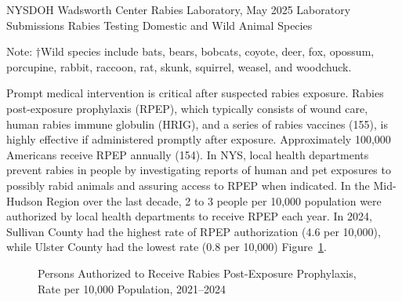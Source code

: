 \documentclass[
  english,
  letterpaper,
]{report}
\begin{document}
\begin{tcolorbox}[enhanced jigsaw, breakable, leftrule=.75mm, title=\textcolor{quarto-callout-note-color}{\faInfo}\hspace{0.5em}{Source}, bottomrule=.15mm, opacityback=0, left=2mm, colback=white, bottomtitle=1mm, coltitle=black, colbacktitle=quarto-callout-note-color!10!white, colframe=quarto-callout-note-color-frame, opacitybacktitle=0.6, toptitle=1mm, titlerule=0mm, arc=.35mm, rightrule=.15mm, toprule=.15mm]

NYSDOH Wadsworth Center Rabies Laboratory, May 2025 Laboratory
Submissions Rabies Testing Domestic and Wild Animal Species

\end{tcolorbox}

\begin{tcolorbox}[enhanced jigsaw, breakable, leftrule=.75mm, title=\textcolor{quarto-callout-note-color}{\faInfo}\hspace{0.5em}{Note}, bottomrule=.15mm, opacityback=0, left=2mm, colback=white, bottomtitle=1mm, coltitle=black, colbacktitle=quarto-callout-note-color!10!white, colframe=quarto-callout-note-color-frame, opacitybacktitle=0.6, toptitle=1mm, titlerule=0mm, arc=.35mm, rightrule=.15mm, toprule=.15mm]

Note: †Wild species include bats, bears, bobcats, coyote, deer, fox,
opossum, porcupine, rabbit, raccoon, rat, skunk, squirrel, weasel, and
woodchuck.

\end{tcolorbox}

Prompt medical intervention is critical after suspected rabies exposure.
Rabies post-exposure prophylaxis (RPEP), which typically consists of
wound care, human rabies immune globulin (HRIG), and a series of rabies
vaccines (155), is highly effective if administered promptly after
exposure. Approximately 100,000 Americans receive RPEP annually (154).
In NYS, local health departments prevent rabies in people by
investigating reports of human and pet exposures to possibly rabid
animals and assuring access to RPEP when indicated. In the Mid-Hudson
Region over the last decade, 2 to 3 people per 10,000 population were
authorized by local health departments to receive RPEP each year. In
2024, Sullivan County had the highest rate of RPEP authorization (4.6
per 10,000), while Ulster County had the lowest rate (0.8 per 10,000)
Figure~\ref{fig-rabies-pep-rate}.

\begin{figure}


\caption{\label{fig-rabies-pep-rate}Persons Authorized to Receive Rabies
Post-Exposure Prophylaxis, Rate per 10,000 Population, 2021--2024}

\end{figure}%
\end{document}
